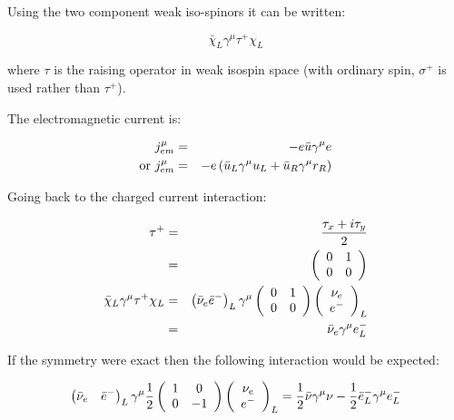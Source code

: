 Using the two component weak iso-spinors it can be written:

\[
  \bar{\chi}_L \gamma^{\mu}\tau^+\chi_L
\]

where $\tau$ is the raising operator in weak isospin space (with ordinary spin, $\sigma^+$ is used rather than $\tau^+$).

The electromagnetic current is:

\begin{eqnarray*}
  j^{\mu}_{em} & = & -e \bar{u}\gamma^{\mu}e \\
  \textrm{or } j^{\mu}_{em} & = & -e\left(\bar{u}_L\gamma^{\mu}u_L + \bar{u}_R\gamma^{\mu}r_R\right)
\end{eqnarray*}

Going back to the charged current interaction:

\begin{eqnarray*}
  \tau^+ & = & \frac{\tau_x + i\tau_y}{2} \\
  & = &
  \left(
  \begin{array}{cc}
    0 & 1 \\
    0 & 0
  \end{array}
  \right)
  \\
  \bar{\chi}_L\gamma^{\mu}\tau^+\chi_L & = & \left(\bar{\nu}_{e}\bar{e}^-\right)_L\gamma^{\mu}
  \left(
  \begin{array}{cc}
    0 & 1 \\
    0 & 0
  \end{array}
  \right)
  \left(
  \begin{array}{c}
    \nu_{e} \\
    e^-
  \end{array}
  \right)_L \\
  & = & \bar{\nu}_{e}\gamma^{\mu}e^-_L
\end{eqnarray*}

If the symmetry were exact then the following interaction would be expected:

\begin{eqnarray*}
  \left( \bar{\nu}_{e} \quad \bar{e}^-\right)_L \gamma^{\mu}\frac{1}{2}
  \left(
    \begin{array}{cc}
      1 & 0 \\
      0 & -1
    \end{array}
    \right)
    \left(
    \begin{array}{c}
      \nu_{e} \\
      e^-
    \end{array}
    \right)_L
    = \frac{1}{2}\bar{\nu}\gamma^{\mu}\nu - \frac{1}{2}\bar{e}^-_L\gamma^{\mu}e^-_L
\end{eqnarray*}

